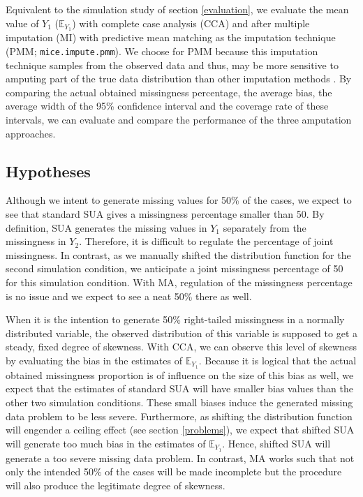 \documentclass[11pt,a4paper]{article}
\newcommand{\code}[1]{\texttt{#1}}
\begin{document}
Equivalent to the simulation study of section \ref{evaluation}, we evaluate the mean value of $Y_1$ ($\mathbb{E}_{Y_1}$) with complete case analysis (CCA) and after multiple imputation (MI) with predictive mean matching as the imputation technique (PMM; \code{mice.impute.pmm}). We choose for PMM because this imputation technique samples from the observed data and thus, may be more sensitive to amputing part of the true data distribution than other imputation methods \citep{Vink2014}. By comparing the actual obtained missingness percentage, the average bias, the average width of the 95\% confidence interval and the coverage rate of these intervals, we can evaluate and compare the performance of the three amputation approaches. 

\subsection{\normalsize Hypotheses}

Although we intent to generate missing values for 50\% of the cases, we expect to see that standard SUA gives a missingness percentage smaller than 50. By definition, SUA generates the missing values in $Y_1$ separately from the missingness in $Y_2$. Therefore, it is difficult to regulate the percentage of joint missingness. In contrast, as we manually shifted the distribution function for the second simulation condition, we anticipate a joint missingness percentage of 50 for this simulation condition. With MA, regulation of the missingness percentage is no issue and we expect to see a neat 50\% there as well. 

When it is the intention to generate 50\% right-tailed missingness in a normally distributed variable, the observed distribution of this variable is supposed to get a steady, fixed degree of skewness. With CCA, we can observe this level of skewness by evaluating the bias in the estimates of $\mathbb{E}_{Y_1}$. Because it is logical that the actual obtained missingness proportion is of influence on the size of this bias as well, we expect that the estimates of standard SUA will have smaller bias values than the other two simulation conditions. These small biases induce the generated missing data problem to be less severe. Furthermore, as shifting the distribution function will engender a ceiling effect (see section \ref{problems}), we expect that shifted SUA will generate too much bias in the estimates of $\mathbb{E}_{Y_1}$. Hence, shifted SUA will generate a too severe missing data problem. In contrast, MA works such that not only the intended 50\% of the cases will be made incomplete but the procedure will also produce the legitimate degree of skewness.
\end{document}
